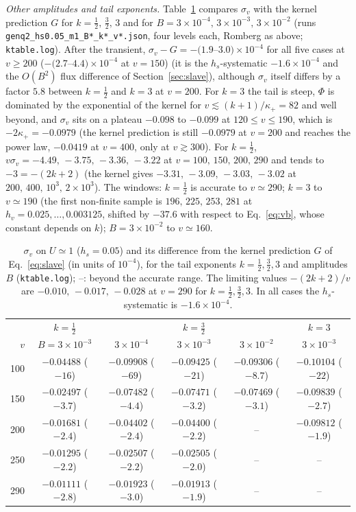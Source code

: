 \documentclass[11pt]{article}
\begin{document}
\emph{Other amplitudes and tail exponents.} Table~\ref{tab:k} compares $\sigma_v$ with the kernel prediction $G$ for $k=\tfrac12,\,\tfrac32,\,3$ and for $B=3\times10^{-4},\,3\times10^{-3},\,3\times10^{-2}$ (runs \texttt{genq2\_hs0.05\_m1\_B*\_k*\_v*.json}, four levels each, Romberg as above; \texttt{ktable.log}). After the transient, $\sigma_v-G=-(1.9$--$3.0)\times10^{-4}$ for all five cases at $v\ge200$ ($-(2.7$--$4.4)\times10^{-4}$ at $v=150$) (it is the $h_s$-systematic $-1.6\times10^{-4}$ and the $O(B^{2})$ flux difference of Section~\ref{sec:slave}), although $\sigma_v$ itself differs by a factor $5.8$ between $k=\tfrac12$ and $k=3$ at $v=200$. For $k=3$ the tail is steep, $\Phi$ is dominated by the exponential of the kernel for $v\lesssim(k+1)/\kappa_+=82$ and well beyond, and $\sigma_v$ sits on a plateau $-0.098$ to $-0.099$ at $120\le v\le190$, which is $-2\kappa_+=-0.0979$ (the kernel prediction is still $-0.0979$ at $v=200$ and reaches the power law, $-0.0419$ at $v=400$, only at $v\gtrsim300$). For $k=\tfrac12$, $v\sigma_v=-4.49,\,-3.75,\,-3.36,\,-3.22$ at $v=100,\,150,\,200,\,290$ and tends to $-3=-(2k+2)$ (the kernel gives $-3.31,\,-3.09,\,-3.03,\,-3.02$ at $200,\,400,\,10^{3},\,2\times10^{3}$). The windows: $k=\tfrac12$ is accurate to $v\simeq290$; $k=3$ to $v\simeq190$ (the first non-finite sample is $196,\,225,\,253,\,281$ at $h_v=0.025,\ldots,0.003125$, shifted by $-37.6$ with respect to Eq.~\eqref{eq:vb}, whose constant depends on $k$); $B=3\times10^{-2}$ to $v\simeq160$.

\begin{table}[ht]\centering\small
\caption{$\sigma_v$ on $U\simeq1$ ($h_s=0.05$) and its difference from the kernel prediction $G$ of Eq.~\eqref{eq:slave} (in units of $10^{-4}$), for the tail exponents $k=\tfrac12,\tfrac32,3$ and amplitudes $B$ (\texttt{ktable.log}); --: beyond the accurate range. The limiting values $-(2k+2)/v$ are $-0.010,\,-0.017,\,-0.028$ at $v=290$ for $k=\tfrac12,\tfrac32,3$. In all cases the $h_s$-systematic is $-1.6\times10^{-4}$.}\label{tab:k}
\begin{tabular}{rccccc}
\toprule
 & $k=\tfrac12$ & \multicolumn{3}{c}{$k=\tfrac32$} & $k=3$\\
$v$ & $B=3\!\times\!10^{-3}$ & $3\!\times\!10^{-4}$ & $3\!\times\!10^{-3}$ & $3\!\times\!10^{-2}$ & $3\!\times\!10^{-3}$\\\midrule
100 & $-0.04488$ ($-16$) & $-0.09908$ ($-69$) & $-0.09425$ ($-21$) & $-0.09306$ ($-8.7$) & $-0.10104$ ($-22$)\\
150 & $-0.02497$ ($-3.7$) & $-0.07482$ ($-4.4$) & $-0.07471$ ($-3.2$) & $-0.07469$ ($-3.1$) & $-0.09839$ ($-2.7$)\\
200 & $-0.01681$ ($-2.4$) & $-0.04402$ ($-2.4$) & $-0.04400$ ($-2.2$) & -- & $-0.09812$ ($-1.9$)\\
250 & $-0.01295$ ($-2.2$) & $-0.02507$ ($-2.2$) & $-0.02505$ ($-2.0$) & -- & --\\
290 & $-0.01111$ ($-2.8$) & $-0.01923$ ($-3.0$) & $-0.01913$ ($-1.9$) & -- & --\\\bottomrule
\end{tabular}
\end{table}
\end{document}
